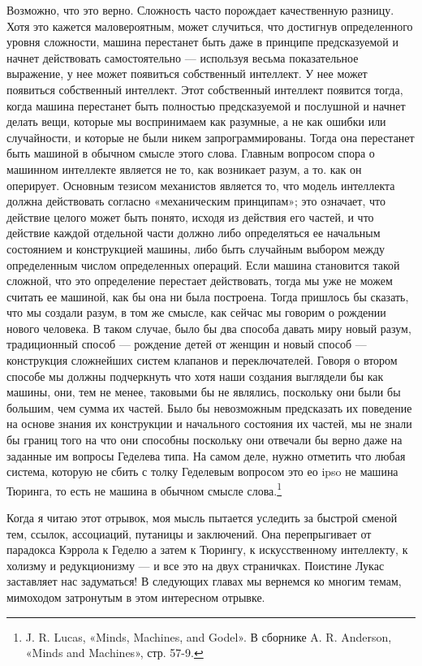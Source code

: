 \documentclass[../main.tex]{subfiles}
\begin{document}
Возможно, что это верно. Сложность часто порождает качественную разницу. Хотя это кажется маловероятным, может случиться, что достигнув определенного уровня сложности, машина перестанет быть даже в принципе предсказуемой и начнет действовать самостоятельно --- используя весьма показательное выражение, у нее может появиться собственный интеллект. У нее может появиться собственный интеллект. Этот собственный интеллект появится тогда, когда машина перестанет быть полностью предсказуемой и послушной и начнет делать вещи, которые мы воспринимаем как разумные, а не как ошибки или случайности, и которые не были никем запрограммированы. Тогда она перестанет быть машиной в обычном смысле этого слова. Главным вопросом спора о машинном интеллекте является не то, как возникает разум, а то. как он оперирует. Основным тезисом механистов является то, что модель интеллекта должна действовать согласно «механическим принципам»; это означает, что действие целого может быть понято, исходя из действия его частей, и что действие каждой отдельной части должно либо определяться ее начальным состоянием и конструкцией машины, либо быть случайным выбором между определенным числом определенных операций. Если машина становится такой сложной, что это определение перестает действовать, тогда мы уже не можем считать ее машиной, как бы она ни была построена. Тогда пришлось бы сказать, что мы создали разум, в том же смысле, как сейчас мы говорим о рождении нового человека. В таком случае, было бы два способа давать миру новый разум, традиционный способ --- рождение детей от женщин и новый способ --- конструкция сложнейших систем клапанов и переключателей. Говоря о втором способе мы должны подчеркнуть что хотя наши создания выглядели бы как машины, они, тем не менее, таковыми бы не являлись, поскольку они были бы большим, чем сумма их частей. Было бы невозможным предсказать их поведение на основе знания их конструкции и начального состояния их частей, мы не знали бы границ того на что они способны поскольку они отвечали бы верно даже на заданные им вопросы Геделева типа. На самом деле, нужно отметить что любая система, которую не сбить с толку Геделевым вопросом это ео ipso не машина Тюринга, то есть не машина в обычном смысле слова.\footnote{J. R. Lucas, «Minds, Machines, and Godel». В сборнике A. R. Anderson, «Minds and Machines», стр. 57-9.}

Когда я читаю этот отрывок, моя мысль пытается уследить за быстрой сменой тем, ссылок, ассоциаций, путаницы и заключений. Она перепрыгивает от парадокса Кэррола к Геделю а затем к Тюрингу, к искусственному интеллекту, к холизму и редукционизму --- и все это на двух страничках. Поистине Лукас заставляет нас задуматься! В следующих главах мы вернемся ко многим темам, мимоходом затронутым в этом интересном отрывке.
\end{document}

